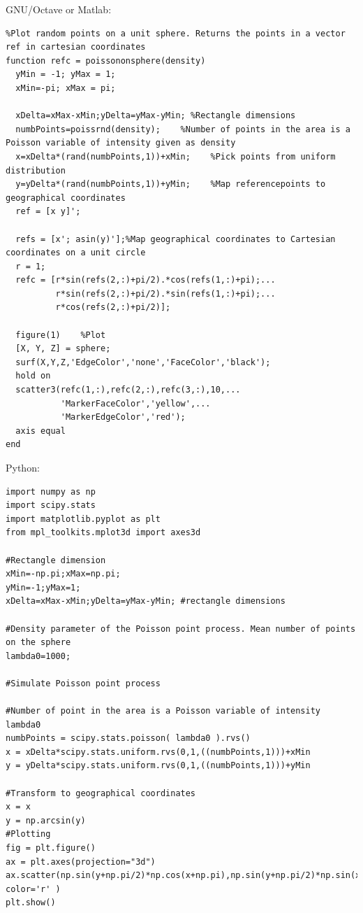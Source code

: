 \documentclass{article}
\begin{document}
GNU/Octave or Matlab:
\begin{verbatim}
%Plot random points on a unit sphere. Returns the points in a vector ref in cartesian coordinates
function refc = poissononsphere(density)
  yMin = -1; yMax = 1;
  xMin=-pi; xMax = pi;
  
  xDelta=xMax-xMin;yDelta=yMax-yMin; %Rectangle dimensions
  numbPoints=poissrnd(density);    %Number of points in the area is a Poisson variable of intensity given as density
  x=xDelta*(rand(numbPoints,1))+xMin;    %Pick points from uniform distribution
  y=yDelta*(rand(numbPoints,1))+yMin;    %Map referencepoints to geographical coordinates
  ref = [x y]';

  refs = [x'; asin(y)'];%Map geographical coordinates to Cartesian coordinates on a unit circle
  r = 1;
  refc = [r*sin(refs(2,:)+pi/2).*cos(refs(1,:)+pi);...
          r*sin(refs(2,:)+pi/2).*sin(refs(1,:)+pi);...
          r*cos(refs(2,:)+pi/2)];

  figure(1)    %Plot
  [X, Y, Z] = sphere;
  surf(X,Y,Z,'EdgeColor','none','FaceColor','black');
  hold on
  scatter3(refc(1,:),refc(2,:),refc(3,:),10,...
           'MarkerFaceColor','yellow',...
           'MarkerEdgeColor','red');
  axis equal
end
\end{verbatim}

Python:

\begin{verbatim}
import numpy as np
import scipy.stats
import matplotlib.pyplot as plt
from mpl_toolkits.mplot3d import axes3d

#Rectangle dimension
xMin=-np.pi;xMax=np.pi;
yMin=-1;yMax=1;
xDelta=xMax-xMin;yDelta=yMax-yMin; #rectangle dimensions

#Density parameter of the Poisson point process. Mean number of points on the sphere
lambda0=1000; 

#Simulate Poisson point process

#Number of point in the area is a Poisson variable of intensity lambda0
numbPoints = scipy.stats.poisson( lambda0 ).rvs()
x = xDelta*scipy.stats.uniform.rvs(0,1,((numbPoints,1)))+xMin
y = yDelta*scipy.stats.uniform.rvs(0,1,((numbPoints,1)))+yMin

#Transform to geographical coordinates
x = x
y = np.arcsin(y)
#Plotting
fig = plt.figure()
ax = plt.axes(projection="3d")
ax.scatter(np.sin(y+np.pi/2)*np.cos(x+np.pi),np.sin(y+np.pi/2)*np.sin(x+np.pi),np.cos(y+np.pi/2), color='r' )
plt.show()
  
\end{verbatim}
\end{document}
